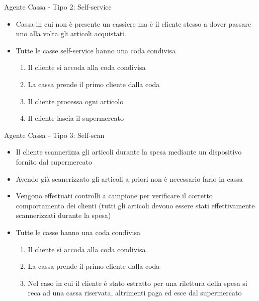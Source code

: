 \begin{frame}{Agente Cassa - Tipo 2: Self-service}
	
	\begin{itemize}
		\item Cassa in cui non è presente un cassiere ma è il cliente stesso a dover passare uno alla volta gli articoli acquistati.
		\item Tutte le casse self-service hanno una coda condivisa
		\begin{enumerate}
			\item Il cliente si accoda alla coda condivisa
			\item La cassa prende il primo cliente dalla coda
			\item Il cliente processa ogni articolo
			\item Il cliente lascia il supermercato
		\end{enumerate}		
	\end{itemize}
\end{frame}

\begin{frame}{Agente Cassa - Tipo 3: Self-scan}
	
	\begin{itemize}
		\item Il cliente scannerizza gli articoli durante la spesa mediante un dispositivo fornito dal supermercato
		\item Avendo già scanerizzato gli articoli a priori non è necessario farlo in cassa
		\item Vengono effettuati controlli a campione per verificare il corretto comportamento dei clienti (tutti gli articoli devono essere stati effettivamente scannerizzati durante la spesa)
		\item Tutte le casse hanno una coda condivisa
		\begin{enumerate}
			\item Il cliente si accoda alla coda condivisa
			\item La cassa prende il primo cliente dalla coda
			\item Nel caso in cui il cliente è stato estratto per una rilettura della spesa si reca ad una cassa riservata, altrimenti paga ed esce dal supermercato
		\end{enumerate}		
	\end{itemize}
\end{frame}

